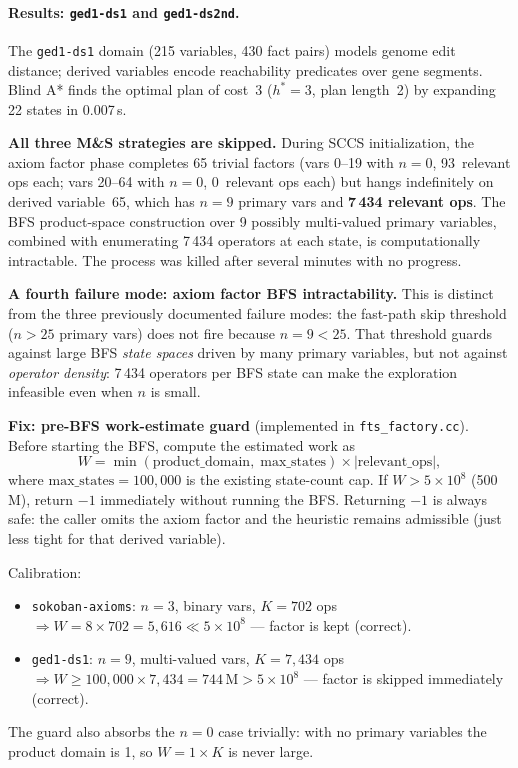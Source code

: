 \documentclass[11pt,a4paper]{article}
\begin{document}
    \paragraph{Results: \texttt{ged1-ds1} and \texttt{ged1-ds2nd}.}

    The \texttt{ged1-ds1} domain (215 variables, 430 fact pairs) models genome
    edit distance; derived variables encode reachability predicates over gene
    segments.  Blind A* finds the optimal plan of cost~3 ($h^* = 3$, plan
    length~2) by expanding 22 states in 0.007\,s.

    \textbf{All three M\&S strategies are skipped.}  During SCCS
    initialization, the axiom factor phase completes 65 trivial factors
    (vars 0--19 with $n = 0$, 93~relevant ops each; vars 20--64 with
    $n = 0$, 0~relevant ops each) but hangs indefinitely on derived
    variable~65, which has $n = 9$ primary vars and \textbf{7\,434 relevant
    ops}.  The BFS product-space construction over 9 possibly multi-valued
    primary variables, combined with enumerating 7\,434 operators at each
    state, is computationally intractable.  The process was killed after
    several minutes with no progress.

    \textbf{A fourth failure mode: axiom factor BFS intractability.}
    This is distinct from the three previously documented failure modes:
    the fast-path skip threshold ($n > 25$ primary vars) does not fire
    because $n = 9 < 25$.  That threshold guards against large BFS
    \emph{state spaces} driven by many primary variables, but not against
    \emph{operator density}: 7\,434 operators per BFS state can make the
    exploration infeasible even when $n$ is small.

    \textbf{Fix: pre-BFS work-estimate guard} (implemented in
    \texttt{fts\_factory.cc}).  Before starting the BFS, compute the
    estimated work as
    \[
      W = \min(\text{product\_domain},\; \text{max\_states}) \times
          |\text{relevant\_ops}|,
    \]
    where $\text{max\_states} = 100{,}000$ is the existing state-count cap.
    If $W > 5 \times 10^8$ (500\,M), return $-1$ immediately without
    running the BFS.  Returning $-1$ is always safe: the caller omits the
    axiom factor and the heuristic remains admissible (just less tight for
    that derived variable).

    Calibration:
    \begin{itemize}
      \item \texttt{sokoban-axioms}: $n=3$, binary vars, $K=702$ ops
            $\Rightarrow W = 8 \times 702 = 5{,}616 \ll 5 \times 10^8$ —
            factor is kept (correct).
      \item \texttt{ged1-ds1}: $n=9$, multi-valued vars, $K=7{,}434$ ops
            $\Rightarrow W \geq 100{,}000 \times 7{,}434 = 744\,\text{M}
            > 5 \times 10^8$ — factor is skipped immediately (correct).
    \end{itemize}
    The guard also absorbs the $n = 0$ case trivially: with no primary
    variables the product domain is 1, so $W = 1 \times K$ is never large.
\end{document}
